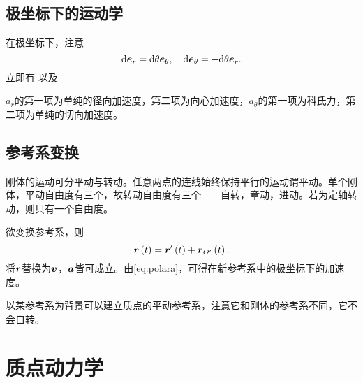 \documentclass{ctexrep}
\begin{document}
\subsection{极坐标下的运动学}
在极坐标下，注意
\[ \mathrm{d} \boldsymbol{e}_r =  \mathrm{d} \theta \boldsymbol{e}_\theta, \quad \mathrm{d} \boldsymbol{e}_\theta = -\mathrm{d}\theta \boldsymbol{e}_r.  \]
立即有
以及
\par
$a_r$的第一项为单纯的径向加速度，第二项为向心加速度，$a_\theta$的第一项为科氏力，第二项为单纯的切向加速度。
\subsection{参考系变换}
刚体的运动可分平动与转动。任意两点的连线始终保持平行的运动谓平动。单个刚体，平动自由度有三个，故转动自由度有三个——自转，章动，进动。若为定轴转动，则只有一个自由度。
\par
欲变换参考系，则
\[ \boldsymbol{r}\left(t\right) = \boldsymbol{r}'\left(t\right) + \boldsymbol{r}_{O'}\left(t\right). \]
将$\boldsymbol{r}$替换为$\boldsymbol{v}$，$\boldsymbol{a}$皆可成立。由\eqref{eq:polara}，可得在新参考系中的极坐标下的加速度。
\par
以某参考系为背景可以建立质点的平动参考系，注意它和刚体的参考系不同，它不会自转。
\section{质点动力学}
\end{document}
